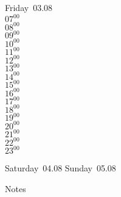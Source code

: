 \documentclass[11pt, a4paper]{book}\usepackage[]{graphicx}\usepackage[]{color}
\begin{document}
\begin{weekdaybox}
  Friday~03.08\\
  { 
  \vfill
  $07^{00}$\\
$08^{00}$\\
$09^{00}$\\
$10^{00}$\\
$11^{00}$\\
$12^{00}$\\
$13^{00}$\\
$14^{00}$\\
$15^{00}$\\
$16^{00}$\\
$17^{00}$\\
$18^{00}$\\
$19^{00}$\\
$20^{00}$\\
$21^{00}$\\
$22^{00}$\\
$23^{00}$\\
  }
\end{weekdaybox}
\begin{weekendbox}
  Saturday~04.08
  \tcblower
  Sunday~05.08
\end{weekendbox} %
\begin{notebox}
  Notes
\end{notebox}
\clearpage

\clearpage
{}
\clearpage
{}
\clearpage
{}
\clearpage
{}
\clearpage
{}
\clearpage
{}
\clearpage
{}
\clearpage
{}
\clearpage
{}
\clearpage
{}
\clearpage
{}
\clearpage
{}
\clearpage
{}
\clearpage
{}
\clearpage
{}
\clearpage
{}
\clearpage
{}
\clearpage
{}
\clearpage
{}
\clearpage
\end{document}
